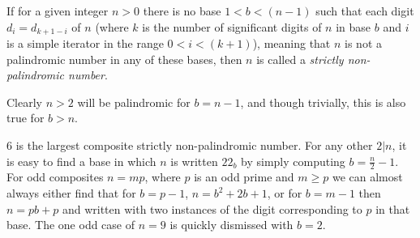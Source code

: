 \documentclass[12pt]{article}
\begin{document}
If for a given integer $n > 0$ there is no base $1 < b < (n - 1)$ such that each digit $d_i = d_{k + 1 - i}$ of $n$ (where $k$ is the number of significant digits of $n$ in base $b$ and $i$ is a simple iterator in the range $0 < i < (k + 1)$), meaning that $n$ is not a palindromic number in any of these bases, then $n$ is called a {\em strictly non-palindromic number}.

Clearly $n > 2$ will be palindromic for $b = n - 1$, and though trivially, this is also true for $b > n$.

6 is the largest composite strictly non-palindromic number. For any other $2|n$, it is easy to find a base in which $n$ is written $22_b$ by simply computing $b = \frac{n}{2} - 1$. For odd composites $n = mp$, where $p$ is an odd prime and $m \ge p$ we can almost always either find that for $b = p - 1$, $n = b^2 + 2b + 1$, or for $b = m - 1$ then $n = pb + p$ and written with two instances of the digit corresponding to $p$ in that base. The one odd case of $n = 9$ is quickly dismissed with $b = 2$.
\end{document}
